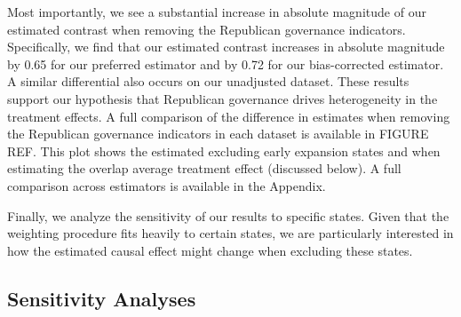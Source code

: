 \documentclass[12pt]{article}
\begin{document}
Most importantly, we see a substantial increase in absolute magnitude of our estimated contrast when removing the Republican governance indicators. Specifically, we find that our estimated contrast increases in absolute magnitude by 0.65 for our preferred estimator and by 0.72 for our bias-corrected estimator. A similar differential also occurs on our unadjusted dataset. These results support our hypothesis that Republican governance drives heterogeneity in the treatment effects. A full comparison of the difference in estimates when removing the Republican governance indicators in each dataset is available in FIGURE REF. This plot shows the estimated excluding early expansion states and when estimating the overlap average treatment effect (discussed below). A full comparison across estimators is available in the Appendix.

Finally, we analyze the sensitivity of our results to specific states. Given that the weighting procedure fits heavily to certain states, we are particularly interested in how the estimated causal effect might change when excluding these states.

\subsection{Sensitivity Analyses}
\end{document}

